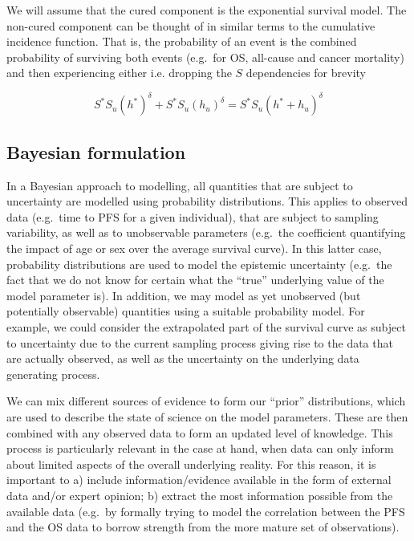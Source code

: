 \documentclass[
]{article}
\begin{document}
We will assume that the cured component is the exponential survival
model. The non-cured component can be thought of in similar terms to the
cumulative incidence function. That is, the probability of an event is
the combined probability of surviving both events (e.g.~for OS,
all-cause and cancer mortality) and then experiencing either i.e.
dropping the \(S\) dependencies for brevity

\begin{equation}
\tag{**}
S^* S_u (h^*)^{\delta} + S^* S_u (h_u)^{\delta} = S^* S_u (h^* + h_u)^{\delta}
\end{equation}

\hypertarget{bayesian-formulation}{%
\subsection{Bayesian formulation}\label{bayesian-formulation}}

In a Bayesian approach to modelling, all quantities that are subject to
uncertainty are modelled using probability distributions. This applies
to observed data (e.g.~time to PFS for a given individual), that are
subject to sampling variability, as well as to unobservable parameters
(e.g.~the coefficient quantifying the impact of age or sex over the
average survival curve). In this latter case, probability distributions
are used to model the epistemic uncertainty (e.g.~the fact that we do
not know for certain what the ``true'' underlying value of the model
parameter is). In addition, we may model as yet unobserved (but
potentially observable) quantities using a suitable probability model.
For example, we could consider the extrapolated part of the survival
curve as subject to uncertainty due to the current sampling process
giving rise to the data that are actually observed, as well as the
uncertainty on the underlying data generating process.

We can mix different sources of evidence to form our ``prior''
distributions, which are used to describe the state of science on the
model parameters. These are then combined with any observed data to form
an updated level of knowledge. This process is particularly relevant in
the case at hand, when data can only inform about limited aspects of the
overall underlying reality. For this reason, it is important to a)
include information/evidence available in the form of external data
and/or expert opinion; b) extract the most information possible from the
available data (e.g.~by formally trying to model the correlation between
the PFS and the OS data to borrow strength from the more mature set of
observations).
\end{document}
